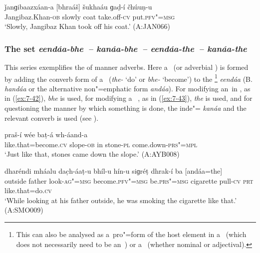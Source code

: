 \begin{exe}
\ex
\label{ex:7-41}
\gll ǰanɡibaazxáan-a [bhraáš] šukhaáu ɡaḍ-í čhúuṇ-u \\
Jangibaz.Khan-\textsc{ob} slowly coat take.off-\textsc{cv} put.\textsc{pfv"=msg}  \\
\glt `Slowly, Jangibaz Khan took off his coat.' (A:JAN066)
\end{exe}

\subsubsection*{The  set \textit{eendáa-bhe~-- kanáa-bhe~-- eendáa-the~--
    kanáa-the}} %

This series exemplifies the  of manner adverbs. Here a~  (or adverbial ) is formed by adding the converb form of a~ (\textit{the-} `do' or \textit{bhe-}
`become') to the  \footnote{This can also be analysed as a~pro"=form of the host
  element in a~ (which does not necessarily need to be an~) or a~
   (whether nominal or adjectival).} \textit{eendáa} (B. \textit{handáa} or the alternative
non"=emphatic form \textit{andáa}). For modifying an~in , as in (\ref{ex:7-42}),
\textit{bhe} is used, for modifying a~ , as in (\ref{ex:7-43}), \textit{the} is
used, and for questioning the manner by which something is done, the inde"=
\textit{kanáa} and the relevant converb is used (see ).

\begin{exe}
\ex
\label{ex:7-42}
\gll [andáa=bhe] praš-í wée baṭ-á wh-áand-a \\
like.that=become.\textsc{cv} slope-\textsc{ob} in stone-\textsc{pl} come.down-\textsc{prs"=mpl} \\
\glt `Just like that, stones came down the slope.' (A:AYB008)
\end{exe}
\begin{exe}
\ex
\label{ex:7-43}
\gll dharéndi mháalu dac̣h-áaṭ-u bhíl-u hín-u  siɡréṭ dhrak-í ba [andáa=the] \\
outside father look-\textsc{ag"=msg} become.\textsc{pfv"=msg} be.\textsc{prs"=msg} cigarette pull-\textsc{cv} \textsc{prt} like.that=do.\textsc{cv}  \\
\glt `While looking at his father outside, he was smoking the cigarette like that.' (A:SMO009)
\end{exe}

